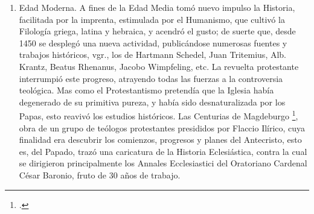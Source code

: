 \raggedbottom{} \documentclass[12pt, a4paper, openany]{book} %
\begin{document}
\begin{enumerate}
        Crónicas nos dejaron San Isidoro de Sevilla (PL.\@ 83), Beda el Venerable (PL.\@ 95), Regino de Prüm, m. 915 (PL.\@ 132, MG.\@ SS.\@ 1.\@ 537, ss.), Herman Contracto, m. 1054 (PL.\@ 143, MG.\@ SS.\@ 5.\@ 67 ss.), Lamberto de Hersfeld, m.\@ 1080 (PL.\@ 146, MG.\@ SS.\@ 1, 3 y 5), Sigeberto de Gemblours, m.\@ 1112 (PL.\@ 160, MG.\@ SS.\@ 6.\@ 260), Otón de Frisinga, m.\@ 1158 (PL.\@ 189, MG.\@ SS.\@ 20.\@ 83 ss.) y otros. Gregorio de Tours (m.\@ 594) escribió la Historia de los Francos (PL.\@ 71, MG.\@ SS.\@ rer.\@ Mer.\@ v.\@ 1.), continuada por Fredegario; Beda la Histor.\@ gentis Anglorum (PL.\@ 95); Isidoro de Sevilla la Histor.\@ gentis Visigothorum (PL.\@ 83), Pablo Warnefrido (m.\@ 799) la Histor.\@ gentis Langobardorum (PL.\@ 95), Flodoardo (m.\@ 966) la Histor.\@ Rhemensis (PL.\@ 135, MG.\@ SS.\@ 13), Adam de Brema la Gesta pontif.\@ Hammaburgens.\@ (PL.\@ 146). Para la Historia de los Papas es de grande importancia el Liber Pontificalis \footcite{Duchesne1884Liber}, colección de biografías de los Papas, cuya primera redacción se coloca a principios del siglo vi, la segunda termina el 687, la tercera el 715; todo él fué refundido y continuado hasta 882. Son generales la Historia Eclesiástica de Haimón de Halberstad (PL.\@ 116), la Historia tripartita de Anastasio bibliotecario (PL.\@ 108), la Historia Eclesiástica de Orderico Vital (m.\@ c.\@ 1142.\@ PL.\@ 188), la de Ptolomeo de Lucca\footnote{Bei Muratori, Rer.\ ital.\ script.\ 11.\ 751 ss.}, discípulo de Santo Tomás de Aquino, y la Summa historialis de San Antonino de Florencia (m. 1459)\footnote{Ed.\ Norimb.\ 1484, Lugd.\ 1512.},
  \item Edad Moderna. A fines de la Edad Media tomó nuevo impulso la Historia, facilitada por la imprenta, estimulada por el Humanismo, que cultivó la Filología griega, latina y hebraica, y acendró el gusto; de suerte que, desde 1450 se desplegó una nueva actividad, publicándose numerosas fuentes y trabajos históricos, vgr., los de Hartmann Schedel, Juan Tritemius, Alb. Krantz, Beatus Rhenanus, Jacobo Wimpfeling, etc. La revuelta protestante interrumpió este progreso, atrayendo todas las fuerzas a la controversia teológica. Mas como el Protestantismo pretendía que la Iglesia había degenerado de su primitiva pureza, y había sido desnaturalizada por los Papas, esto reavivó los estudios históricos. Las Centurias de Magdeburgo \footcite{Magdeb1559Eccles}, obra de un grupo de teólogos protestantes presididos por Flaccio Ilírico, cuya finalidad era descubrir los comienzos, progresos y planes del Antecristo, esto es, del Papado, trazó una caricatura de la Historia Eclesiástica, contra la cual se dirigieron principalmente los Annales Ecclesiastici del Oratoriano Cardenal César Baronio, fruto de 30 años de trabajo.\\

\end{enumerate}
\end{document}
